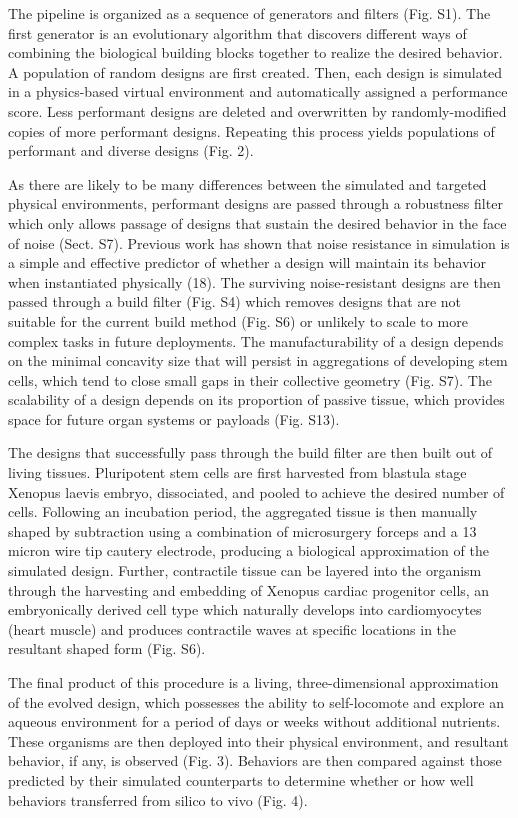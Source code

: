 The pipeline is organized as a sequence of generators and filters (Fig. S1). The first generator is an evolutionary algorithm that discovers different ways of combining the biological building blocks together to realize the desired behavior. A population of random designs are first created. Then, each design is simulated in a physics-based virtual environment and automatically assigned a performance score. Less performant designs are deleted and overwritten by randomly-modified copies of more performant designs. Repeating this process yields populations of performant and diverse designs (Fig. 2).

As there are likely to be many differences between the simulated and targeted physical environments, performant designs are passed through a robustness filter which only allows passage of designs that sustain the desired behavior in the face of noise (Sect. S7). Previous work has shown that noise resistance in simulation is a simple and effective predictor of whether a design will maintain its behavior when instantiated physically (18). 
The surviving noise-resistant designs are then passed through a build filter (Fig. S4) which removes designs that are not suitable for the current build method (Fig. S6) or unlikely to scale to more complex tasks in future deployments. The manufacturability of a design depends on the minimal concavity size that will persist in aggregations of developing stem cells, which tend to close small gaps in their collective geometry (Fig. S7). The scalability of a design depends on its proportion of passive tissue, which provides space for future organ systems or payloads (Fig. S13).

The designs that successfully pass through the build filter are then built out of living tissues. Pluripotent stem cells are first harvested from blastula stage Xenopus laevis embryo, dissociated, and pooled to achieve the desired number of cells. Following an incubation period, the aggregated tissue is then manually shaped by subtraction using a combination of microsurgery forceps and a 13 micron wire tip cautery electrode, producing a biological approximation of the simulated design. Further, contractile tissue can be layered into the organism through the harvesting and embedding of Xenopus cardiac progenitor cells, an embryonically derived cell type which naturally develops into cardiomyocytes (heart muscle) and produces contractile waves at specific locations in the resultant shaped form (Fig. S6).

The final product of this procedure is a living, three-dimensional approximation of the evolved design, which possesses the ability to self-locomote and explore an aqueous environment for a period of days or weeks without additional nutrients. These organisms are then deployed into their physical environment, and resultant behavior, if any, is observed (Fig. 3). Behaviors are then compared against those predicted by their simulated counterparts to determine whether or how well behaviors transferred from silico to vivo (Fig. 4).


